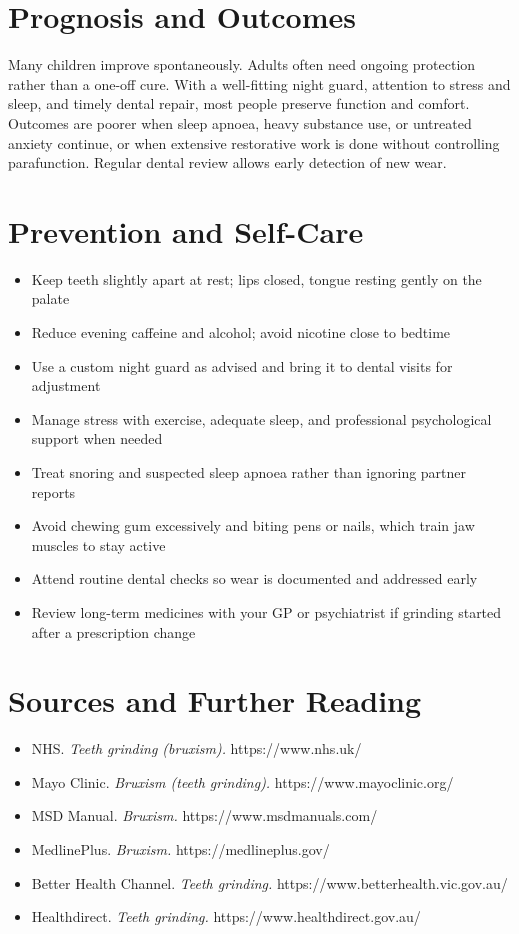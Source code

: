 \section*{Prognosis and Outcomes}
Many children improve spontaneously. Adults often need ongoing protection rather than a one-off cure. With a well-fitting night guard, attention to stress and sleep, and timely dental repair, most people preserve function and comfort. Outcomes are poorer when sleep apnoea, heavy substance use, or untreated anxiety continue, or when extensive restorative work is done without controlling parafunction. Regular dental review allows early detection of new wear.

\section*{Prevention and Self-Care}
\begin{itemize}
    \item Keep teeth slightly apart at rest; lips closed, tongue resting gently on the palate
    \item Reduce evening caffeine and alcohol; avoid nicotine close to bedtime
    \item Use a custom night guard as advised and bring it to dental visits for adjustment
    \item Manage stress with exercise, adequate sleep, and professional psychological support when needed
    \item Treat snoring and suspected sleep apnoea rather than ignoring partner reports
    \item Avoid chewing gum excessively and biting pens or nails, which train jaw muscles to stay active
    \item Attend routine dental checks so wear is documented and addressed early
    \item Review long-term medicines with your GP or psychiatrist if grinding started after a prescription change
\end{itemize}

\section*{Sources and Further Reading}
\begin{itemize}
    \item NHS. \textit{Teeth grinding (bruxism).} https://www.nhs.uk/
    \item Mayo Clinic. \textit{Bruxism (teeth grinding).} https://www.mayoclinic.org/
    \item MSD Manual. \textit{Bruxism.} https://www.msdmanuals.com/
    \item MedlinePlus. \textit{Bruxism.} https://medlineplus.gov/
    \item Better Health Channel. \textit{Teeth grinding.} https://www.betterhealth.vic.gov.au/
    \item Healthdirect. \textit{Teeth grinding.} https://www.healthdirect.gov.au/
\end{itemize}
